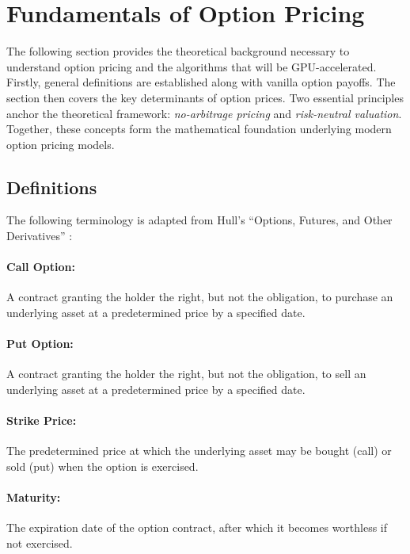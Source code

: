 \documentclass[english,12pt,a4paper,pdftex,sci,utf8]{aaltothesis}
\begin{document}
\clearpage

\section{Fundamentals of Option Pricing} \label{sec:theory}

The following section provides the theoretical background necessary to understand option pricing and the algorithms that will be GPU-accelerated. Firstly, general definitions are established along with vanilla option payoffs. The section then covers the key determinants of option prices. Two essential principles anchor the theoretical framework: \emph{no-arbitrage pricing} and \emph{risk-neutral valuation}. Together, these concepts form the mathematical foundation underlying modern option pricing models.

\subsection{Definitions}\label{subsec:definitions}
The following terminology is adapted from Hull's ``Options, Futures, and Other Derivatives'' \cite{hull2016options}:

\paragraph{Call Option:} A contract granting the holder the right, but not the obligation, to purchase an underlying asset at a predetermined price by a specified date.

\paragraph{Put Option:} A contract granting the holder the right, but not the obligation, to sell an underlying asset at a predetermined price by a specified date.

\paragraph{Strike Price:} The predetermined price at which the underlying asset may be bought (call) or sold (put) when the option is exercised.

\paragraph{Maturity:} The expiration date of the option contract, after which it becomes worthless if not exercised.
\bigskip
\end{document}

